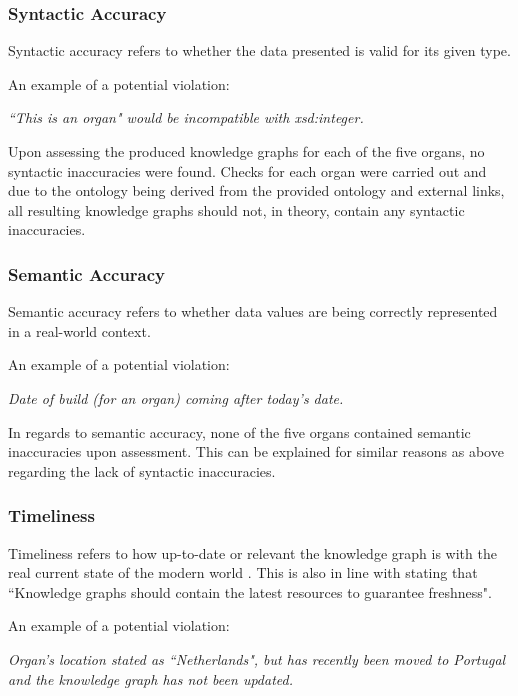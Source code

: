 \subsubsection{Syntactic Accuracy}
\hspace{0.5cm} Syntactic accuracy refers to whether the data presented is valid for its given type. \cite{knowledgegraphevaulationbook}

\noindent An example of a potential violation: 
\begin{displayquote}
    \textit{``This is an organ" would be incompatible with xsd:integer.}
\end{displayquote}

Upon assessing the produced knowledge graphs for each of the five organs, no syntactic inaccuracies were found. Checks for each organ were carried out and due to the ontology being derived from the provided ontology and external links, all resulting knowledge graphs should not, in theory, contain any syntactic inaccuracies. 

\subsubsection{Semantic Accuracy}
\hspace{0.5cm} Semantic accuracy refers to whether data values are being correctly represented in a real-world context. \cite{knowledgegraphevaulationbook}

\noindent An example of a potential violation: 
\begin{displayquote}
    \textit{Date of build (for an organ) coming after today's date.}
\end{displayquote}

In regards to semantic accuracy, none of the five organs contained semantic inaccuracies upon assessment. This can be explained for similar reasons as above regarding the lack of syntactic inaccuracies. 

\subsubsection{Timeliness}
\hspace{0.5cm} Timeliness refers to how up-to-date or relevant the knowledge graph is with the real current state of the modern world \cite{knowledgegraphevaulationbook}. This is also in line with \cite{evaluationpaper} stating that ``Knowledge graphs should contain the latest resources to guarantee freshness".

\noindent An example of a potential violation:
\begin{displayquote}
    \textit{Organ's location stated as ``Netherlands", but has recently been moved to Portugal and the knowledge graph has not been updated.}
\end{displayquote}

